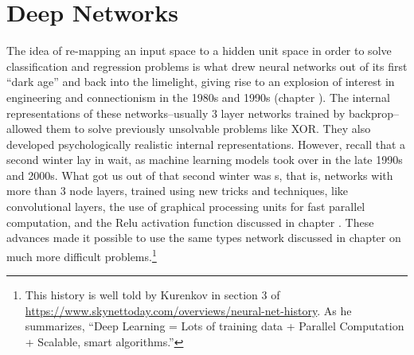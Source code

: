 \chapter{Deep Networks}\label{deepNets}


The idea of re-mapping an input space to a hidden unit space in order to solve classification and regression problems is what drew neural networks out of its first ``dark age'' and back into the limelight, giving rise to an explosion of interest in engineering and connectionism in the 1980s and 1990s (chapter ). The internal representations of these networks--usually 3 layer networks trained by backprop--allowed them to solve previously unsolvable problems like XOR. They also developed psychologically realistic internal representations. However, recall that a second  winter lay in wait, as machine learning models took over in the late 1990s and 2000s. What got us out of that second winter was s, that is, networks with more than 3 node layers, trained using new tricks and techniques, like convolutional layers, the use of graphical processing units for fast parallel computation, and the Relu activation function discussed in chapter . These advances made it possible to use the same types network discussed in chapter  on much more difficult problems.\footnote{This history is well told by Kurenkov in section 3 of \url{https://www.skynettoday.com/overviews/neural-net-history}. As he summarizes, ``Deep Learning = Lots of training data + Parallel Computation + Scalable, smart algorithms.''} 

